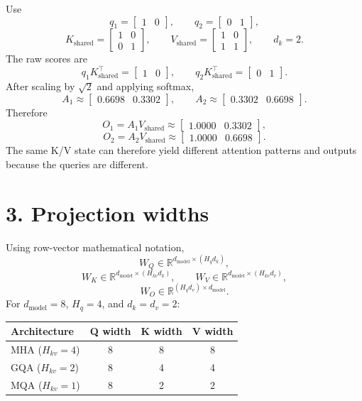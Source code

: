 \documentclass[11pt]{article}
\begin{document}
Use
\[
q_1=\begin{bmatrix}1&0\end{bmatrix},
\qquad
q_2=\begin{bmatrix}0&1\end{bmatrix},
\]
\[
K_{\mathrm{shared}}=
\begin{bmatrix}
1&0\\
0&1
\end{bmatrix},
\qquad
V_{\mathrm{shared}}=
\begin{bmatrix}
1&0\\
1&1
\end{bmatrix},
\qquad d_k=2.
\]
The raw scores are
\[
q_1K_{\mathrm{shared}}^\top=\begin{bmatrix}1&0\end{bmatrix},
\qquad
q_2K_{\mathrm{shared}}^\top=\begin{bmatrix}0&1\end{bmatrix}.
\]
After scaling by $\sqrt{2}$ and applying softmax,
\[
A_1\approx\begin{bmatrix}0.6698&0.3302\end{bmatrix},
\qquad
A_2\approx\begin{bmatrix}0.3302&0.6698\end{bmatrix}.
\]
Therefore
\[
O_1=A_1V_{\mathrm{shared}}
\approx\begin{bmatrix}1.0000&0.3302\end{bmatrix},
\]
\[
O_2=A_2V_{\mathrm{shared}}
\approx\begin{bmatrix}1.0000&0.6698\end{bmatrix}.
\]
The same K/V state can therefore yield different attention patterns and outputs because the queries are different.

\section*{3. Projection widths}

Using row-vector mathematical notation,
\[
W_Q\in\mathbb{R}^{d_{\mathrm{model}}\times(H_qd_k)},
\]
\[
W_K\in\mathbb{R}^{d_{\mathrm{model}}\times(H_{kv}d_k)},
\qquad
W_V\in\mathbb{R}^{d_{\mathrm{model}}\times(H_{kv}d_v)},
\]
\[
W_O\in\mathbb{R}^{(H_qd_v)\times d_{\mathrm{model}}}.
\]
For $d_{\mathrm{model}}=8$, $H_q=4$, and $d_k=d_v=2$:

\begin{center}
\begin{tabular}{@{}lccc@{}}
\toprule
Architecture & Q width & K width & V width\\
\midrule
MHA ($H_{kv}=4$) & 8 & 8 & 8\\
GQA ($H_{kv}=2$) & 8 & 4 & 4\\
MQA ($H_{kv}=1$) & 8 & 2 & 2\\
\bottomrule
\end{tabular}
\end{center}
\end{document}
